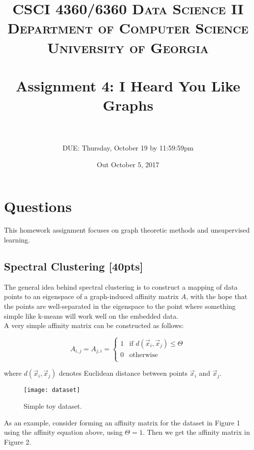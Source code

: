 \documentclass[paper=a4, fontsize=11pt]{scrartcl} %
\title{	
\normalfont \normalsize 
\textsc{CSCI 4360/6360 Data Science II} \\
\textsc{Department of Computer Science} \\
\textsc{University of Georgia} \\ [15pt] %
\horrule{0.5pt} \\[0.3cm] %
\huge Assignment 4: I Heard You Like Graphs \\ %
\horrule{2pt} \\[0.4cm] %
}
\author{DUE: Thursday, October 19 by 11:59:59pm} %
\date{\normalsize Out October 5, 2017}
\numberwithin{figure}{section} %
\numberwithin{table}{section} %
\begin{document}
\maketitle %


\section*{Questions}

This homework assignment focuses on graph theoretic methods and unsupervised learning.

\setcounter{subsection}{0}

\subsection{Spectral Clustering \textbf{[40pts]}}

The general idea behind spectral clustering is to construct a mapping of data points to an eigenspace of a graph-induced affinity matrix $A$, with the hope that the points are well-separated in the eigenspace to the point where something simple like k-means will work well on the embedded data. \\

A very simple affinity matrix can be constructed as follows:

$$
A_{i, j} = A_{j, i} =
	\begin{cases}
		1 & \textrm{if } d(\vec{x}_i, \vec{x}_j) \leq \Theta \\
		0 & \textrm{otherwise} \\
	\end{cases} 
$$

where $d(\vec{x}_i, \vec{x}_j)$ denotes Euclidean distance between points $\vec{x}_i$ and $\vec{x}_j$. \\

\begin{figure}[h]
	\centering
	\texttt{[image: dataset]}
	\label{fig:data1}
	\caption{Simple toy dataset.}
\end{figure}

As an example, consider forming an affinity matrix for the dataset in Figure 1 using the affinity equation above, using $\Theta = 1$. Then we get the affinity matrix in Figure 2. \\
\end{document}
